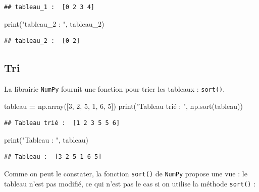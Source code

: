 \documentclass[12pt,]{book}
\newenvironment{Shaded}{\begin{snugshade}}{\end{snugshade}}
\newcommand{\DecValTok}[1]{\textcolor[rgb]{0.00,0.00,0.81}{#1}}
\newcommand{\StringTok}[1]{\textcolor[rgb]{0.31,0.60,0.02}{#1}}
\newcommand{\OperatorTok}[1]{\textcolor[rgb]{0.81,0.36,0.00}{\textbf{#1}}}
\newcommand{\BuiltInTok}[1]{#1}
\newcommand{\NormalTok}[1]{#1}
\numberwithin{equation}{section}
\numberwithin{countremarque}{section}
\begin{document}
\begin{lstlisting}
## tableau_1 :  [0 2 3 4]
\end{lstlisting}

\begin{Shaded}
\begin{Highlighting}[]
\BuiltInTok{print}\NormalTok{(}\StringTok{"tableau_2 : "}\NormalTok{, tableau_2)}
\end{Highlighting}
\end{Shaded}

\begin{lstlisting}
## tableau_2 :  [0 2]
\end{lstlisting}

\subsection{Tri}\label{tri-1}

La librairie \texttt{NumPy} fournit une fonction pour trier les tableaux
: \texttt{sort()}.

\begin{Shaded}
\begin{Highlighting}[]
\NormalTok{tableau }\OperatorTok{=}\NormalTok{ np.array([}\DecValTok{3}\NormalTok{, }\DecValTok{2}\NormalTok{, }\DecValTok{5}\NormalTok{, }\DecValTok{1}\NormalTok{, }\DecValTok{6}\NormalTok{, }\DecValTok{5}\NormalTok{])}
\BuiltInTok{print}\NormalTok{(}\StringTok{"Tableau trié : "}\NormalTok{, np.sort(tableau))}
\end{Highlighting}
\end{Shaded}

\begin{lstlisting}
## Tableau trié :  [1 2 3 5 5 6]
\end{lstlisting}

\begin{Shaded}
\begin{Highlighting}[]
\BuiltInTok{print}\NormalTok{(}\StringTok{"Tableau : "}\NormalTok{, tableau)}
\end{Highlighting}
\end{Shaded}

\begin{lstlisting}
## Tableau :  [3 2 5 1 6 5]
\end{lstlisting}

Comme on peut le constater, la fonction \texttt{sort()} de
\texttt{NumPy} propose une vue : le tableau n'est pas modifié, ce qui
n'est pas le cas si on utilise la méthode \texttt{sort()} :
\end{document}
